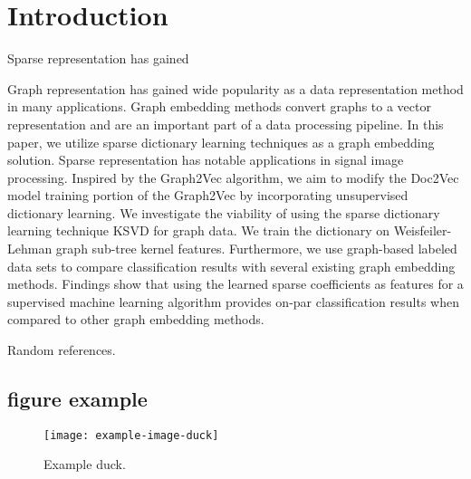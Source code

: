 \chapter{Introduction}\label{ch:introduction}

Sparse representation has gained 

Graph representation has gained wide popularity as a data representation method in many applications. Graph embedding methods convert graphs to a vector representation and are an important part of a data processing pipeline. In this paper, we utilize sparse dictionary learning techniques as a graph embedding solution. Sparse representation has notable applications in signal image processing. Inspired by the Graph2Vec algorithm, we aim to modify the Doc2Vec model training portion of the Graph2Vec by incorporating unsupervised dictionary learning. We investigate the viability of using the sparse dictionary learning technique KSVD for graph data. We train the dictionary on Weisfeiler-Lehman graph sub-tree kernel features. Furthermore, we use graph-based labeled data sets to compare classification results with several existing graph embedding methods. Findings show that using the learned sparse coefficients as features for a supervised machine learning algorithm provides on-par classification results when compared to other graph embedding methods. 

Random references\cite{Aharon2006}.

\section{figure example}


\begin{figure}[b!]
    \centering
    \texttt{[image: example-image-duck]}
    \caption[Example duck]{Example duck.}\label{fig:example}
\end{figure}